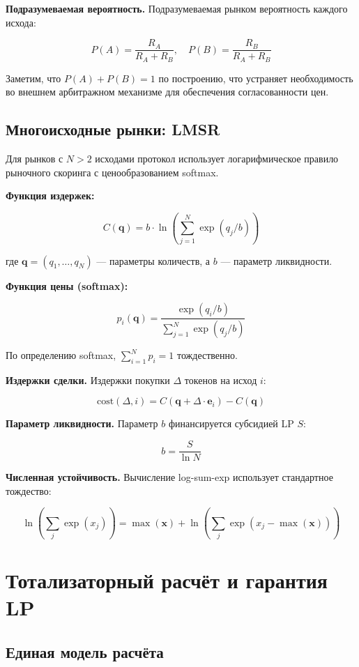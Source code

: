 \documentclass{ledger}
\theoremstyle{plain}
\theoremstyle{remark}
\begin{document}
\textbf{Подразумеваемая вероятность.} Подразумеваемая рынком вероятность каждого
исхода:

\[
P(A) = \frac{R_A}{R_A + R_B}, \quad P(B) = \frac{R_B}{R_A + R_B}
\]

Заметим, что $P(A) + P(B) = 1$ по построению, что устраняет необходимость во
внешнем арбитражном механизме для обеспечения согласованности цен.

\subsection{Многоисходные рынки: LMSR}

Для рынков с $N > 2$ исходами протокол использует логарифмическое правило
рыночного скоринга с ценообразованием softmax.

\textbf{Функция издержек:}

\[
C(\mathbf{q}) = b \cdot \ln\left(\sum_{j=1}^{N} \exp(q_j / b)\right)
\]

где $\mathbf{q} = (q_1, \ldots, q_N)$ --- параметры количеств, а $b$ --- параметр
ликвидности.

\textbf{Функция цены (softmax):}

\[
p_i(\mathbf{q}) = \frac{\exp(q_i / b)}{\sum_{j=1}^{N} \exp(q_j / b)}
\]

По определению softmax, $\sum_{i=1}^{N} p_i = 1$ тождественно.

\textbf{Издержки сделки.} Издержки покупки $\Delta$ токенов на исход $i$:

\[
\text{cost}(\Delta, i) = C(\mathbf{q} + \Delta \cdot \mathbf{e}_i) - C(\mathbf{q})
\]

\textbf{Параметр ликвидности.} Параметр $b$ финансируется субсидией LP $S$:

\[
b = \frac{S}{\ln N}
\]

\textbf{Численная устойчивость.} Вычисление log-sum-exp использует стандартное
тождество:

\[
\ln\left(\sum_j \exp(x_j)\right) = \max(\mathbf{x}) +
\ln\left(\sum_j \exp(x_j - \max(\mathbf{x}))\right)
\]

\section{Тотализаторный расчёт и гарантия LP}\label{sec:settlement}

\subsection{Единая модель расчёта}\label{sec:unified}
\end{document}

